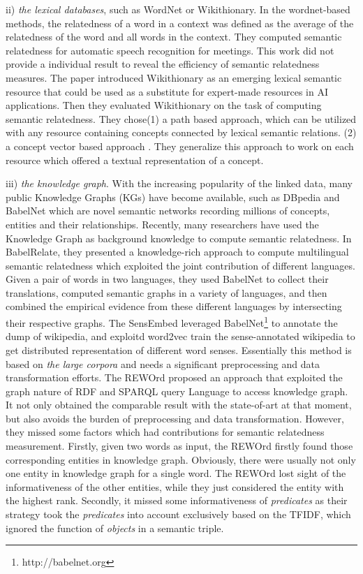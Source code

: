 ii) \emph{the lexical databases}, such as WordNet or Wikithionary. 
In the wordnet-based methods\cite{acl/Pucher07}, the relatedness of a word in a context was
defined as the average of the relatedness of the word and all words in the context. They computed
semantic relatedness for automatic speech recognition for meetings. This work did not provide a individual result
to reveal the efficiency of semantic relatedness measures.
The paper \cite{aaai/ZeschMG08} introduced Wikithionary as an emerging lexical semantic resource
that could be used as a substitute for expert-made resources in AI applications.
Then they evaluated Wikithionary on the task of computing semantic relatedness.
They chose(1) a path based approach\cite{its/Rada89}, which can be utilized with any
resource containing concepts connected by lexical semantic relations. (2) a concept vector based approach
\cite{ijcai/GabrilovichM07}. They generalize this approach to work on each
resource which offered a textual representation of a concept.

iii) \emph{the knowledge graph}. 
With the increasing popularity of the linked data, many public Knowledge Graphs (KGs) have
become available, such as DBpedia and BabelNet which are novel semantic networks recording millions
of concepts, entities and their relationships. Recently, many researchers have used the Knowledge Graph as
background knowledge to compute semantic relatedness. In BabelRelate\cite{aaai/NavigliP12}, they presented
a knowledge-rich approach to compute multilingual semantic
relatedness which exploited the joint contribution of different languages. Given a pair of words 
in two languages, they used BabelNet to collect their translations, computed semantic
graphs in a variety of languages, and then combined the empirical evidence from these 
different languages by intersecting their respective graphs. 
The SensEmbed \cite{acl/IacobacciPN15} leveraged BabelNet\footnote{http://babelnet.org} to annotate the dump of wikipedia,
and exploitd word2vec\cite{corr/Mikolov13} train the sense-annotated wikipedia to get distributed representation of different 
word senses. Essentially this method is based on \emph{the large corpora} and needs a significant preprocessing
and data transformation efforts. 
The REWOrd\cite{aaai/Pirro12} proposed an approach that exploited the graph nature of RDF and SPARQL query
Language to access knowledge graph. It not only obtained the comparable
result with the state-of-art at that moment, but also avoids the burden
of preprocessing and data transformation.
However, they missed some factors which had contributions for semantic relatedness measurement. 
Firstly, given two words as input, the REWOrd firstly found those corresponding entities in knowledge
graph. Obviously, there were usually not only one entity in knowledge graph for a single
word. The REWOrd lost sight of the informativeness of the other entities, while they just
considered the entity with the highest rank. Secondly, it missed some informativeness of \emph{predicates} as their strategy took
the \emph{predicates} into account exclusively based on the TFIDF, which ignored the function of \emph{objects} in a semantic triple.


